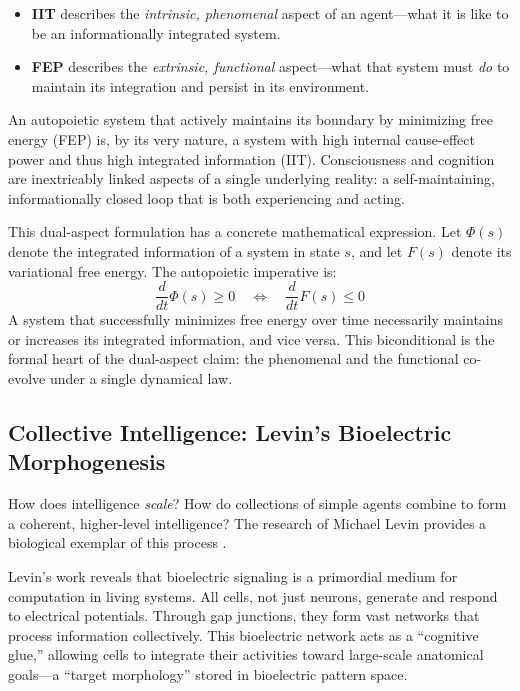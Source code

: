 \documentclass[12pt,a4paper]{article}
\begin{document}
\begin{itemize}
    \item \textbf{IIT} describes the \emph{intrinsic, phenomenal} aspect of
        an agent---what it is like to be an informationally integrated
        system.
    \item \textbf{FEP} describes the \emph{extrinsic, functional}
        aspect---what that system must \emph{do} to maintain its
        integration and persist in its environment.
\end{itemize}

An autopoietic system that actively maintains its boundary by minimizing
free energy (FEP) is, by its very nature, a system with high internal
cause-effect power and thus high integrated information (IIT).
Consciousness and cognition are inextricably linked aspects of a single
underlying reality: a self-maintaining, informationally closed loop that is
both experiencing and acting.

This dual-aspect formulation has a concrete mathematical expression.  Let
$\Phi(s)$ denote the integrated information of a system in state $s$, and
let $F(s)$ denote its variational free energy.  The autopoietic imperative
is:
\begin{equation}
    \label{eq:dual}
    \frac{d}{dt}\Phi(s) \geq 0 \quad \Longleftrightarrow \quad
    \frac{d}{dt}F(s) \leq 0
\end{equation}
A system that successfully minimizes free energy over time necessarily
maintains or increases its integrated information, and vice versa.  This
biconditional is the formal heart of the dual-aspect claim: the phenomenal
and the functional co-evolve under a single dynamical law.

\subsection{Collective Intelligence: Levin's Bioelectric Morphogenesis}
\label{sec:levin}

How does intelligence \emph{scale}?  How do collections of simple agents
combine to form a coherent, higher-level intelligence?  The research of
Michael Levin provides a biological exemplar of this process
\citep{levin2019,levin2021,levin2023}.

Levin's work reveals that bioelectric signaling is a primordial medium for
computation in living systems.  All cells, not just neurons, generate and
respond to electrical potentials.  Through gap junctions, they form vast
networks that process information collectively.  This bioelectric network
acts as a ``cognitive glue,'' allowing cells to integrate their activities
toward large-scale anatomical goals---a ``target morphology'' stored in
bioelectric pattern space.
\end{document}
